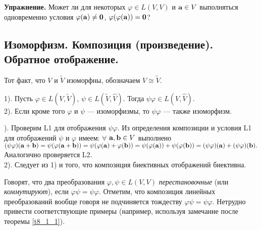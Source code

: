 \otstup

{\bf Упражнение.} Может ли для некоторых $\varphi \in L(V, V)$ и $\mathbf{a}\in V$ выполняться
одновременно условия $\varphi (\mathbf{a})\neq \mathbf{0}$, $\varphi (\varphi (\mathbf{a}))= \mathbf{0}$?


\subsection{Изоморфизм. Композиция (произведение). Обратное отображение. }



Тот факт, что $V$ и $\widetilde{V}$ изоморфны, обозначаем $V\cong \widetilde{V}$.



\begin{predl}\label{p8_1_2}
1). Пусть $\varphi \in L(V, \widetilde{V})$, $\psi \in L(\widetilde{V}, \widehat{V})$. Тогда  
$\psi  \varphi \in L(V, \widehat{V})$.\\
2). Если кроме того $\varphi$ и $\psi$ --- изоморфизмы, то
$\psi  \varphi$ --- также изоморфизм.
\end{predl}
). Проверим L1 для отображения $\psi  \varphi$. Из определения композиции и условия L1 для отображений $\psi $ и $\varphi$ 
имеем: $\forall$ $\mathbf{a}, \mathbf{b}\in V$ выполнено \\ $(\psi  \varphi)(\mathbf{a} + \mathbf{b}) = 
\psi  (\varphi(\mathbf{a} + \mathbf{b})) = \psi  (\varphi(\mathbf{a}) + \varphi (\mathbf{b}))  = 
\psi  (\varphi(\mathbf{a})) + \psi  (\varphi (\mathbf{b}))  = 
(\psi  \varphi)(\mathbf{a}) + (\psi  \varphi) (\mathbf{b}). $ \\
Аналогично проверяется L2.\\
2). Следует из 1) и того, что композиция биективных отображений биективна.
\edok

\otstup

Говорят, что два преобразования $\varphi ,\psi \in L(V, V)$  {\it перестановочные} (или {\it коммутируют}), если $\varphi \psi= \psi \varphi $.
Отметим, что композиция линейных преобразований вообще говоря не подчиняется тождеству $\varphi \psi= \psi \varphi $.
Нетрудно привести соответствующие примеры (например, используя замечание после теоремы \ref{t8_1_1}).

